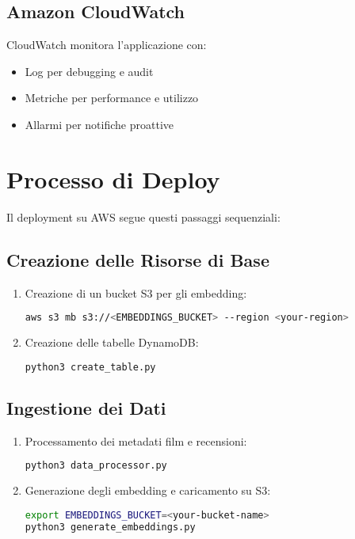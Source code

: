 \documentclass[11pt,a4paper]{article}
\begin{document}
\subsection{Amazon CloudWatch}
CloudWatch monitora l'applicazione con:

\begin{itemize}
  \item Log per debugging e audit
  \item Metriche per performance e utilizzo
  \item Allarmi per notifiche proattive
\end{itemize}

\section{Processo di Deploy}
Il deployment su AWS segue questi passaggi sequenziali:

\subsection{Creazione delle Risorse di Base}
\begin{enumerate}
  \item Creazione di un bucket S3 per gli embedding:
\begin{lstlisting}[language=bash]
aws s3 mb s3://<EMBEDDINGS_BUCKET> --region <your-region>
\end{lstlisting}

  \item Creazione delle tabelle DynamoDB:
\begin{lstlisting}[language=bash]
python3 create_table.py
\end{lstlisting}
\end{enumerate}

\subsection{Ingestione dei Dati}
\begin{enumerate}
  \item Processamento dei metadati film e recensioni:
\begin{lstlisting}[language=bash]
python3 data_processor.py
\end{lstlisting}

  \item Generazione degli embedding e caricamento su S3:
\begin{lstlisting}[language=bash]
export EMBEDDINGS_BUCKET=<your-bucket-name>
python3 generate_embeddings.py
\end{lstlisting}
\end{enumerate}
\end{document}
